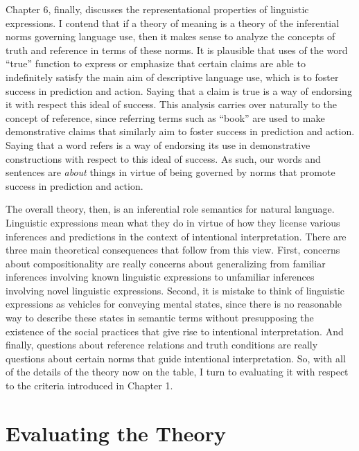 Chapter 6, finally, discusses the representational properties of linguistic expressions. I contend that if a theory of meaning is a theory of the inferential norms governing language use, then it makes sense to analyze the concepts of truth and reference in terms of these norms. It is plausible that uses of the word ``true'' function to express or emphasize that certain claims are able to indefinitely satisfy the main aim of descriptive language use, which is to foster success in prediction and action. Saying that a claim is true is a way of endorsing it with respect this ideal of success. This analysis carries over naturally to the concept of reference, since referring terms such as ``book'' are used to make demonstrative claims that similarly aim to foster success in prediction and action. Saying that a word refers is a way of endorsing its use in demonstrative constructions with respect to this ideal of success. As such, our words and sentences are \textit{about} things in virtue of being governed by norms that promote success in prediction and action.

The overall theory, then, is an inferential role semantics for natural language. Linguistic expressions mean what they do in virtue of how they license various inferences and predictions in the context of intentional interpretation. There are three main theoretical consequences that follow from this view. First, concerns about compositionality are really concerns about generalizing from familiar inferences involving known linguistic expressions to unfamiliar inferences involving novel linguistic expressions. Second, it is mistake to think of linguistic expressions as vehicles for conveying mental states, since there is no reasonable way to describe these states in semantic terms without presupposing the existence of the social practices that give rise to intentional interpretation. And finally, questions about reference relations and truth conditions are really questions about certain norms that guide intentional interpretation. So, with all of the details of the theory now on the table, I turn to evaluating it with respect to the criteria introduced in Chapter 1. 

\section{Evaluating the Theory}

